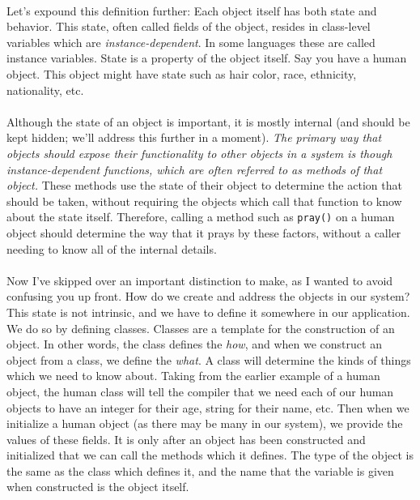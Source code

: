 \documentclass{article}
\begin{document}
\paragraph{}
Let’s expound this definition further: Each object itself has both state and
behavior. This state, often called fields of the object, resides in class-level
variables which are \textit{instance-dependent}. In some languages these are
called
instance variables. State is a property of the object itself. Say you have a
human object. This object might have state such as hair color, race, ethnicity,
nationality, etc.
\paragraph{}
Although the state of an object is important, it is mostly internal (and should
be kept hidden; we'll address this further in a moment). \textit{The primary way that
objects should expose their functionality to other objects in a system is though
instance-dependent functions, which are often referred to as methods of that
object.} These methods use the state of their object to determine the action
that
should be taken, without requiring the objects which call that function to know
about the state itself. Therefore, calling a method such as \texttt{pray()} on a human
object should determine the way that it prays by these factors, without a caller 
needing to know all of the internal details.
\paragraph{}
Now I've skipped over an important distinction to make, as I wanted to avoid
confusing you up front. How do we create and address the objects in our system?
This state is not intrinsic, and we have to define it somewhere in our
application. We do so by defining classes. Classes are a template for the
construction of an object. In other words, the class defines the \textit{how},
and when
we construct an object from a class, we define the \textit{what}. A class will
determine
the kinds of things which we need to know about. Taking from the earlier example
of a human object, the human class will tell the compiler that we need each of
our human objects to have an integer for their age, string for their name, etc.
Then when we initialize a human object (as there may be many in our system), we
provide the values of these fields. It is only after an object has been
constructed and initialized that we can call the methods which it defines. The
type of the object is the same as the class which defines it, and the name that
the variable is given when constructed is the object itself.
\end{document}
